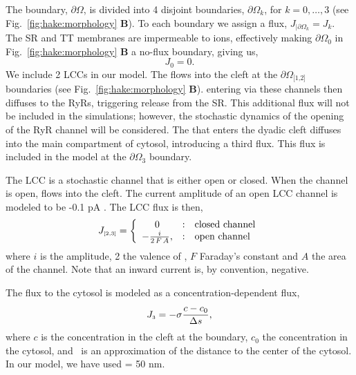 The boundary, $\partial\Omega$, is divided into 4 disjoint boundaries,
$\partial\Omega_k$, for $k=0,\ldots,3$ (see
Fig.~\ref{fig:hake:morphology} \textbf{B}). To each boundary we assign
a flux, $J_{|\partial\Omega_k}=J_k$. The SR and TT membranes are
impermeable to ions, effectively making
$\partial\Omega_{\scriptscriptstyle\text{0}}$ in
Fig.~\ref{fig:hake:morphology} \textbf{B} a no-flux boundary, giving
us,
\begin{equation}
  \label{eq:hake:no-flux}
  J_{\scriptscriptstyle 0}= 0.
\end{equation}
We include 2 LCCs in our model. The \Ca flows into the cleft at the
$\partial\Omega_{\scriptscriptstyle\text{[1,2]}}$ boundaries (see
Fig.~\ref{fig:hake:morphology} \textbf{B}). \Ca entering via these
channels then diffuses to the RyRs, triggering \Ca release from the
SR. This additional \Ca flux will not be included in the simulations;
however, the stochastic dynamics of the opening of the RyR channel
will be considered. The \Ca that enters the dyadic cleft diffuses into
the main compartment of cytosol, introducing a third flux. This flux
is included in the model at the
$\partial\Omega_{\scriptscriptstyle\text{3}}$ boundary.

The LCC is a stochastic channel that is either open or closed. When
the channel is open, \Ca flows into the cleft. The current amplitude
of an open LCC channel is modeled to be -0.1 pA
\citep{GuiaSternLakattaEtAl2001}. The LCC flux is then,
\begin{equation}
\label{eq:hake:constant-current-flux}
J_{\scriptscriptstyle[2,3]}= \left\{
  \begin{array}{c@{\quad:\quad}l}
    0& \text{closed channel}\\
    - \frac{i}{2\,F\,A},& \text{open channel}
  \end{array}
\right.
\end{equation}
\noindent where $i$ is the amplitude, 2 the valence of \Ca, $F$
Faraday's constant and $A$ the area of the channel. Note that an
inward current is, by convention, negative.

The flux to the cytosol is modeled as a concentration-dependent flux,
\begin{equation}
  \label{eq:hake:conc-dependent-flux}
  J_{\scriptscriptstyle 3}= -\sigma\frac{c - c_0}{\Delta{}s},
\end{equation}
where $c$ is the concentration in the cleft at the boundary, $c_0$ the
concentration in the cytosol, and \Ds~is an approximation of the
distance to the center of the cytosol. In our model, we have used \Ds
= 50 nm.

